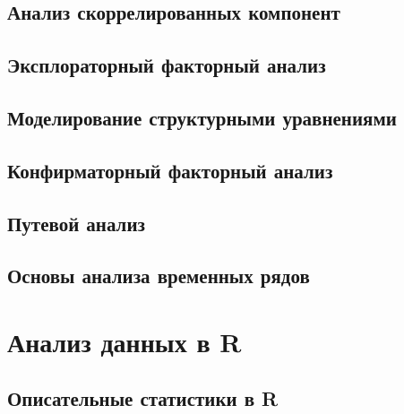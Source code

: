 \documentclass[
  letterpaper,
  DIV=11,
  numbers=noendperiod]{scrreprt}
\theoremstyle{definition}
\theoremstyle{remark}
\begin{document}

\chapter{Анализ скоррелированных компонент}\label{andan-cca}


\chapter{Эксплораторный факторный анализ}\label{andan-efa}


\chapter{Моделирование структурными уравнениями}\label{andan-sem}


\chapter{Конфирматорный факторный анализ}\label{andan-cfa}


\chapter{Путевой анализ}\label{andan-path}


\chapter{Основы анализа временных рядов}\label{andan-timeseries}

\part{Анализ данных в R}


\chapter{Описательные статистики в R}\label{randan-descriptives}

\end{document}
